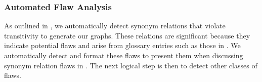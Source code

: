 
\subsubsection{Automated Flaw Analysis}\label{auto-flaw-analysis}

As outlined in , we automatically detect synonym relations
that violate transitivity to generate our graphs. These relations are
significant because they indicate potential flaws and arise from glossary
entries such as those in . We automatically detect
and format these flaws to present them when discussing synonym relation flaws
in . %
The next logical step is then to detect other classes of flaws.

